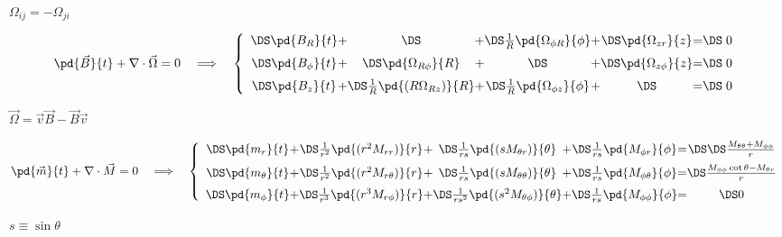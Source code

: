 \documentclass{article}
\begin{document}
$ \Omega_{ij} = -\Omega_{ji} $
\pagebreak

\[
     \pd{\vec{B}}{t} + \nabla\cdot\vec{\Omega} = 0
     \quad \Longrightarrow \quad \left\{
     \begin{array}{c@{+}c@{+}c@{+}c@{=}c}
     \DS \pd{B_{R}}{t}                                & \DS
                                                    & \DS
     \frac{1}{R}\pd{\Omega_{\phi R}}{\phi} & \DS
            \pd{\Omega_{z r}}{z}       & \DS\; 0
     \\ \noalign{\medskip}
     \DS \pd{B_{\phi}}{t}                            & \DS
     \pd{\Omega_{R\phi}}{R}             & \DS
                                            & \DS
        \pd{\Omega_{z\phi}}{z}          & \DS\; 0
    \\ \noalign{\medskip}
    \DS \pd{B_z}{t}                       & \DS
    \frac{1}{R}\pd{(R  \Omega_{Rz})}{R}   & \DS
    \frac{1}{R}\pd{\Omega_{\phi z}}{\phi} & \DS
                                          & \DS\;  0
     \end{array}\right.
   \]
\pagebreak

$ \vec{\Omega} = \vec{v}\vec{B} - \vec{B}\vec{v} $
\pagebreak

\[
     \pd{\vec{m}}{t} + \nabla\cdot\vec{M} = 0
     \quad \Longrightarrow \quad
     \left\{
     \begin{array}{c@{+}c@{+}c@{+}c@{=}c}
       \DS \pd{m_{r}}{t}                            & \DS
       \frac{1}{r^2} \pd{(r^2M_{rr})}{r}           & \DS
      \frac{1}{rs}  \pd{(s  M_{\theta r})}{\theta} & \DS
       \frac{1}{rs}  \pd{    M_{\phi r}}{\phi}      & \DS
       \DS\frac{M_{\theta\theta} + M_{\phi\phi}}{r}
     \\ \noalign{\medskip}
     \DS \pd{m_{\theta}}{t}                        & \DS
     \frac{1}{r^2}\pd{(r^2M_{r\theta})}{r}          & \DS
     \frac{1}{rs} \pd{(s  M_{\theta\theta})}{\theta}  & \DS
     \frac{1}{rs} \pd{    M_{\phi\theta}}{\phi}     & \DS
     \frac{M_{\phi\phi}\cot\theta - M_{\theta r}}{r} 
     \\ \noalign{\medskip}
     \DS \pd{m_{\phi}}{t}                            & \DS
     \frac{1}{r^3} \pd{(r^3 M_{r\phi})}{r}           & \DS
     \frac{1}{rs^2}\pd{(s^2 M_{\theta\phi})}{\theta} & \DS
     \frac{1}{rs}  \pd{     M_{\phi\phi}}{\phi}         & \DS
        0 
     \end{array}\right.
   \]
\pagebreak

$ s\equiv\sin\theta $
\pagebreak
\end{document}
